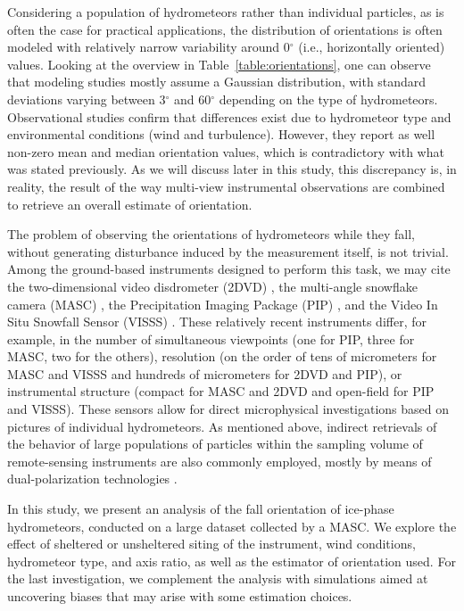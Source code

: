 \documentclass[draft]{agujournal2019}
\begin{document}
Considering a population of hydrometeors rather than individual particles, as is often the case for practical applications, the distribution of orientations is often modeled with relatively narrow variability around 0$^\circ$ (i.e., horizontally oriented) values. Looking at the overview in Table~\ref{table:orientations}, one can observe that modeling studies mostly assume a Gaussian distribution, with standard deviations varying between 3$^\circ$ \cite{Matrosov_JAM_2001} and 60$^\circ$ \cite{Putnam_MWR_2017} depending on the type of hydrometeors. Observational studies \cite{Garrett_GRL_2015} confirm that differences exist due to hydrometeor type and environmental conditions (wind and turbulence). However, they report as well non-zero mean and median orientation values, which is contradictory with what was stated previously. As we will discuss later in this study, this discrepancy is, in reality, the result of the way multi-view instrumental observations are combined to retrieve an overall estimate of orientation.

The problem of observing the orientations of hydrometeors while they fall, without generating disturbance induced by the measurement itself, is not trivial. Among the ground-based instruments designed to perform this task, we may cite the two-dimensional video disdrometer (2DVD) \cite{Kruger_JAOT_2002}, the multi-angle snowflake camera (MASC) \cite{Garrett_AMT_2012}, the Precipitation Imaging Package (PIP) \cite{Pettersen_atmosphere_2020}, and the Video In Situ Snowfall Sensor (VISSS) \cite{Maahn_AMT_2024}. These relatively recent instruments differ, for example, in the number of simultaneous viewpoints (one for PIP, three for MASC, two for the others), resolution (on the order of tens of micrometers for MASC and VISSS and hundreds of micrometers for 2DVD and PIP), or instrumental structure (compact for MASC and 2DVD and open-field for PIP and VISSS). These sensors allow for direct microphysical investigations based on pictures of individual hydrometeors. As mentioned above, indirect retrievals of the behavior of large populations of particles within the sampling volume of remote-sensing instruments are also commonly employed, mostly by means of dual-polarization technologies \cite{Matrosov_JAS_2005}.

In this study, we present an analysis of the fall orientation of ice-phase hydrometeors, conducted on a large dataset collected by a MASC. We explore the effect of sheltered or unsheltered siting of the instrument, wind conditions, hydrometeor type, and axis ratio, as well as the estimator of orientation used. For the last investigation, we complement the analysis with simulations aimed at uncovering biases that may arise with some estimation choices.
\end{document}
